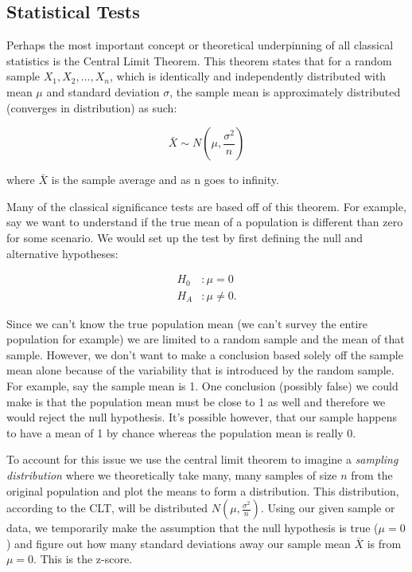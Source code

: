 \subsection{Statistical Tests}

Perhaps the most important concept or theoretical underpinning of all classical statistics is the Central Limit Theorem. This theorem states that for a random sample $X_1, X_2, ..., X_n$, which is identically and independently distributed with mean $\mu$ and standard deviation $\sigma$, the sample mean is approximately distributed (converges in distribution) as such:

\begin{equation}
\bar{X} \sim N(\mu, \frac{\sigma^2}{n})
\end{equation}

\noindent where $\bar{X}$ is the sample average and as n goes to infinity.

Many of the classical significance tests are based off of this theorem. For example, say we want to understand if the true mean of a population is different than zero for some scenario. We would set up the test by first defining the null and alternative hypotheses:

\begin{equation}
\begin{split}
H_0 &: \mu = 0 \\
H_A &:  \mu \neq 0.
\end{split}
\end{equation}

\noindent Since we can't know the true population mean (we can't survey the entire population for example) we are limited to a random sample and the mean of that sample. However, we don't want to make a conclusion based solely off the sample mean alone because of the variability that is introduced by the random sample. For example, say the sample mean is 1. One conclusion (possibly false) we could make is that the population mean must be close to 1 as well and therefore we would reject the null hypothesis. It's possible however, that our sample happens to have a mean of 1 by chance whereas the population mean is really 0.

To account for this issue we use the central limit theorem to imagine a \emph{sampling distribution} where we theoretically take many, many samples of size $n$ from the original population and plot the means to form a distribution. This distribution, according to the CLT, will be distributed $N(\mu, \frac{\sigma^2}{n})$. Using our given sample or data, we temporarily make the assumption that the null hypothesis is true ($\mu=0$) and figure out how many standard deviations away our sample mean $\bar{X}$ is from $\mu=0$. This is the z-score.

